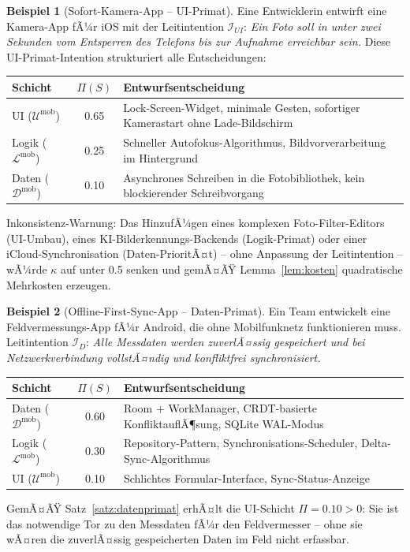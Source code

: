 ﻿\documentclass[a4paper,12pt]{article}
\theoremstyle{definition}
\newtheorem{beispiel}{Beispiel}
\begin{document}
\begin{beispiel}[Sofort-Kamera-App -- UI-Primat]\label{bsp:kamera}
Eine Entwicklerin entwirft eine Kamera-App fÃ¼r iOS mit der Leitintention
$\mathcal{I}_{UI}$: \textit{\glqq{}Ein Foto soll in unter zwei Sekunden vom
Entsperren des Telefons bis zur Aufnahme erreichbar sein.\grqq{}} Diese
UI-Primat-Intention strukturiert alle Entscheidungen:

\begin{center}
\begin{tabular}{lcp{5.5cm}}
\toprule
Schicht & $\Pi(S)$ & Entwurfsentscheidung \\
\midrule
UI ($\mathcal{U}^{\text{mob}}$) & 0.65 & Lock-Screen-Widget, minimale
Gesten, sofortiger Kamerastart ohne Lade-Bildschirm \\
Logik ($\mathcal{L}^{\text{mob}}$) & 0.25 & Schneller Autofokus-Algorithmus,
Bildvorverarbeitung im Hintergrund \\
Daten ($\mathcal{D}^{\text{mob}}$) & 0.10 & Asynchrones Schreiben in die
Fotobibliothek, kein blockierender Schreibvorgang \\
\bottomrule
\end{tabular}
\end{center}

Inkonsistenz-Warnung: Das HinzufÃ¼gen eines komplexen Foto-Filter-Editors
(UI-Umbau), eines KI-Bilderkennungs-Backends (Logik-Primat) oder einer
iCloud-Synchronisation (Daten-PrioritÃ¤t) -- ohne Anpassung der
Leitintention -- wÃ¼rde $\kappa$ auf unter 0.5 senken und gemÃ¤ÃŸ
Lemma~\ref{lem:kosten} quadratische Mehrkosten erzeugen.
\end{beispiel}

\begin{beispiel}[Offline-First-Sync-App -- Daten-Primat]\label{bsp:sync}
Ein Team entwickelt eine Feldvermessungs-App fÃ¼r Android, die ohne
Mobilfunknetz funktionieren muss. Leitintention $\mathcal{I}_D$:
\textit{\glqq{}Alle Messdaten werden zuverlÃ¤ssig gespeichert und bei
Netzwerkverbindung vollstÃ¤ndig und konfliktfrei synchronisiert.\grqq{}}

\begin{center}
\begin{tabular}{lcp{5.5cm}}
\toprule
Schicht & $\Pi(S)$ & Entwurfsentscheidung \\
\midrule
Daten ($\mathcal{D}^{\text{mob}}$) & 0.60 & Room + WorkManager, CRDT-basierte
KonfliktauflÃ¶sung, SQLite WAL-Modus \\
Logik ($\mathcal{L}^{\text{mob}}$) & 0.30 & Repository-Pattern,
Synchronisations-Scheduler, Delta-Sync-Algorithmus \\
UI ($\mathcal{U}^{\text{mob}}$) & 0.10 & Schlichtes Formular-Interface,
Sync-Status-Anzeige \\
\bottomrule
\end{tabular}
\end{center}

GemÃ¤ÃŸ Satz~\ref{satz:datenprimat} erhÃ¤lt die UI-Schicht $\Pi = 0.10 > 0$:
Sie ist das notwendige Tor zu den Messdaten fÃ¼r den Feldvermesser --
ohne sie wÃ¤ren die zuverlÃ¤ssig gespeicherten Daten im Feld nicht erfassbar.
\end{beispiel}
\end{document}
